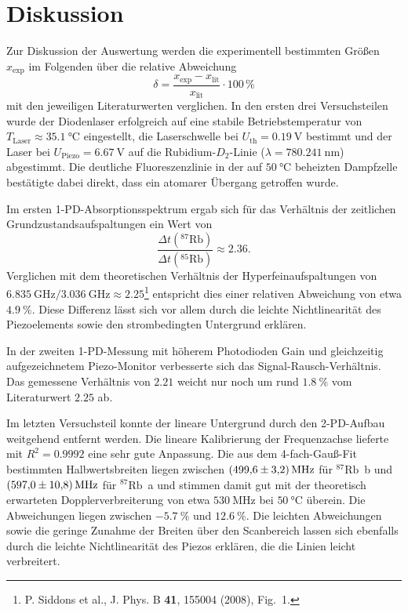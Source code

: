 \newpage

\section{Diskussion}
Zur Diskussion der Auswertung werden die experimentell bestimmten Größen $x_{\text{exp}}$ im Folgenden über die relative Abweichung
\begin{equation*}
    \delta = \frac{x_{\text{exp}} - x_{\text{lit}}}{x_{\text{lit}}} \cdot 100\,\%
\end{equation*}
mit den jeweiligen Literaturwerten verglichen.
In den ersten drei Versuchsteilen wurde der Diodenlaser erfolgreich auf eine stabile Betriebstemperatur von $T_{\text{Laser}} \approx \SI{35.1}{\degreeCelsius}$ eingestellt, die Laserschwelle bei $U_{\text{th}} = \SI{0.19}{\volt}$ bestimmt und der Laser bei $U_{\text{Piezo}} = \SI{6.67}{\volt}$  auf die Rubidium-$D_2$-Linie ($\lambda = \SI{780.241}{\nano\meter}$) abgestimmt. Die deutliche Fluoreszenzlinie in der auf $\SI{50}{\degreeCelsius}$ beheizten Dampfzelle bestätigte dabei direkt, dass ein atomarer Übergang getroffen wurde.

Im ersten 1-PD-Absorptionsspektrum ergab sich für das Verhältnis der zeitlichen Grundzustandsaufspaltungen ein Wert von
\[
    \frac{\Delta t(^{87}\text{Rb})}{\Delta t(^{85}\text{Rb})} \approx \num{2.36}.
\]
Verglichen mit dem theoretischen Verhältnis der Hyperfeinaufspaltungen von $\SI{6.835}{\giga\hertz} / \SI{3.036}{\giga\hertz} \approx \num{2.25}$\footnote{P. Siddons et al., J. Phys. B \textbf{41}, 155004 (2008), Fig.~1.} entspricht dies einer relativen Abweichung von etwa $\SI{4.9}{\percent}$. Diese Differenz lässt sich vor allem durch die leichte Nichtlinearität des Piezoelements sowie den strombedingten Untergrund erklären.

In der zweiten 1-PD-Messung mit höherem Photodioden Gain und gleichzeitig aufgezeichnetem Piezo-Monitor verbesserte sich das Signal-Rausch-Verhältnis. Das gemessene Verhältnis von $\num{2.21}$ weicht nur noch um rund $\SI{1.8}{\percent}$ vom Literaturwert $\num{2.25}$ ab.

Im letzten Versuchsteil konnte der lineare Untergrund durch den 2-PD-Aufbau weitgehend entfernt werden. Die lineare Kalibrierung der Frequenzachse lieferte mit $R^2 = \num{0.9992}$ eine sehr gute Anpassung. Die aus dem 4-fach-Gauß-Fit bestimmten Halbwertsbreiten liegen zwischen $\SI{499.6 \pm 3.2}{\mega\hertz}$  für $^{87}\text{Rb}$~b und $\SI{597.0 \pm 10.8}{\mega\hertz}$ für $^{87}\text{Rb}$~a und stimmen damit gut mit der theoretisch erwarteten Dopplerverbreiterung von etwa $\SI{530}{\mega\hertz}$ bei $\SI{50}{\degreeCelsius}$ überein. Die Abweichungen liegen zwischen $\SI{-5.7}{\percent}$ und $\SI{+12.6}{\percent}$. Die leichten Abweichungen sowie die geringe Zunahme der Breiten über den Scanbereich lassen sich ebenfalls durch die leichte Nichtlinearität des Piezos erklären, die die Linien leicht verbreitert.

